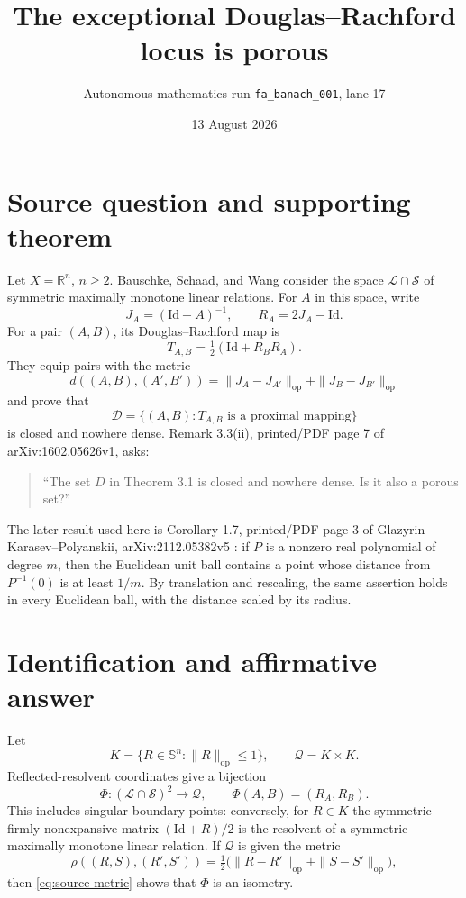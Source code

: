 \documentclass[11pt]{article}
\title{The exceptional Douglas--Rachford locus is porous}
\author{Autonomous mathematics run \texttt{fa\_banach\_001}, lane 17}
\date{13 August 2026}
\newcommand{\Sym}{\mathbb S^n}
\newcommand{\op}{\mathrm{op}}
\newcommand{\Id}{\mathrm{Id}}
\newcommand{\Dset}{\mathcal D}
\newcommand{\Qset}{\mathcal Q}
\begin{document}
\maketitle

\begin{center}
\end{center}

\section{Source question and supporting theorem}

Let $X=\mathbb R^n$, $n\ge2$.  Bauschke, Schaad, and Wang
\cite{BSW} consider the space $\mathcal L\cap\mathcal S$ of symmetric
maximally monotone linear relations.  For $A$ in this space, write
\[
 J_A=(\Id+A)^{-1},\qquad R_A=2J_A-\Id.
\]
For a pair $(A,B)$, its Douglas--Rachford map is
\[
 T_{A,B}=\tfrac12(\Id+R_BR_A).
\]
They equip pairs with the metric
\begin{equation}\label{eq:source-metric}
 d((A,B),(A',B'))
 =\|J_A-J_{A'}\|_{\op}+\|J_B-J_{B'}\|_{\op}
\end{equation}
and prove that
\[
 \Dset=\{(A,B):T_{A,B}\text{ is a proximal mapping}\}
\]
is closed and nowhere dense.  Remark 3.3(ii), printed/PDF page 7 of
arXiv:1602.05626v1, asks:
\begin{quote}
``The set $D$ in Theorem 3.1 is closed and nowhere dense. Is it also a
porous set?''
\end{quote}

The later result used here is Corollary 1.7, printed/PDF page 3 of
Glazyrin--Karasev--Polyanskii, arXiv:2112.05382v5 \cite{GKP}:
if $P$ is a nonzero real polynomial of degree $m$, then the Euclidean unit
ball contains a point whose distance from $P^{-1}(0)$ is at least $1/m$.
By translation and rescaling, the same assertion holds in every Euclidean
ball, with the distance scaled by its radius.

\section{Identification and affirmative answer}

Let
\[
 K=\{R\in\Sym:\|R\|_{\op}\le1\},\qquad \Qset=K\times K.
\]
Reflected-resolvent coordinates give a bijection
\begin{equation}\label{eq:phi}
 \Phi:(\mathcal L\cap\mathcal S)^2\longrightarrow\Qset,
 \qquad \Phi(A,B)=(R_A,R_B).
\end{equation}
This includes singular boundary points: conversely, for $R\in K$ the
symmetric firmly nonexpansive matrix $(\Id+R)/2$ is the resolvent of a
symmetric maximally monotone linear relation.  If $\Qset$ is given the metric
\begin{equation}\label{eq:rho}
 \rho((R,S),(R',S'))
 =\tfrac12\bigl(\|R-R'\|_{\op}+\|S-S'\|_{\op}\bigr),
\end{equation}
then \eqref{eq:source-metric} shows that $\Phi$ is an isometry.
\end{document}
